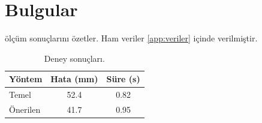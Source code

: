 \chapter{Bulgular}
\label{chap:bulgular}

 ölçüm sonuçlarını özetler. Ham veriler
\cref{app:veriler} içinde verilmiştir.

\begin{table}[htbp]
  \centering
  \caption{Deney sonuçları.}
  \label{tab:sonuclar}
  \begin{tabular}{lSS}
    \toprule
    Yöntem   & {Hata (\si{\milli\metre})} & {Süre (\si{\second})} \\
    \midrule
    Temel    & 52.4                       & 0.82                  \\
    Önerilen & 41.7                       & 0.95                  \\
    \bottomrule
  \end{tabular}
\end{table}
